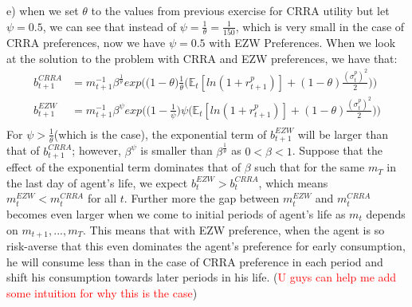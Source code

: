 \documentclass[12pt,a4paper]{article}
\begin{document}
e) when we set $\theta$ to the values from previous exercise for CRRA utility but let $\psi=0.5$, we can see that instead of $\psi=\frac{1}{\theta}=\frac{1}{150}$, which is very small in the case of CRRA preferences, now we have $\psi=0.5$ with EZW Preferences. When we look at the solution to the problem with CRRA and EZW preferences, we have that:
\begin{align*}
    b_{t+1}^{CRRA}&=m_{t+1}^{-1}\beta^{\frac{1}{\theta}}  exp\bigg(\bigg  (1-\theta\bigg)\frac{1}{\theta}\bigg(\mathbb{E}_t[ln(1+r^p_{t+1})]+(1-\theta)\frac{(\sigma_t^p)^2}{2}\bigg)\bigg)\\
     b_{t+1}^{EZW}&=m_{t+1}^{-1}\beta^\psi exp\bigg(\bigg(1-\frac{1}{\psi}\bigg)\psi\bigg(\mathbb{E}_t[ln(1+r^p_{t+1})]+(1-\theta)\frac{(\sigma_t^p)^2}{2}\bigg)\bigg)\\
\end{align*}
For $\psi>\frac{1}{\theta}$(which is the case), the exponential term of $b_{t+1}^{EZW}$ will be larger than that of $b_{t+1}^{CRRA}$; however, $\beta^\psi$ is smaller than $\beta^\frac{1}{\theta}$ as $0<\beta<1$. Suppose that the effect of the exponential term dominates that of $\beta$ such that for the same $m_T$ in the last day of agent's life, we expect $b_t^{EZW}>b_t^{CRRA}$, which means $m_t^{EZW}<m_t^{CRRA}$ for all $t$. Further more the gap between $m_t^{EZW}$ and $m_t^{CRRA}$ becomes even larger when we come to initial periods of agent's life as $m_t$ depends on $m_{t+1},...,m_T$. This means that with EZW preference, when the agent is so risk-averse that this even dominates the agent's preference for early consumption, he will consume less than in the case of CRRA preference in each period and shift his consumption towards later periods in his life. (\textcolor{red}{U guys can help me add some intuition for why this is the case}) \\
\end{document}
